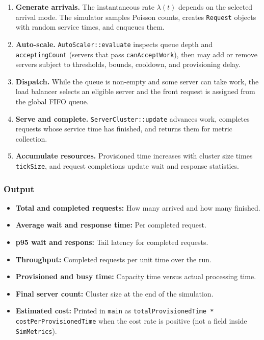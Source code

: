 \documentclass[12pt, a4paper]{article}
\newcommand{\code}[1]{\texttt{\textcolor{NUNavyL}{#1}}}
\begin{document}
\begin{enumerate}[label=\textcolor{NURed}{\textbf{Step \arabic*.}},
                  leftmargin=2.2em]
  \item \textbf{Generate arrivals.} The instantaneous rate $\lambda(t)$ depends
    on the selected arrival mode. The simulator samples Poisson counts, creates
    \code{Request} objects with random service times, and enqueues them.
  \item \textbf{Auto-scale.} \code{AutoScaler::evaluate} inspects queue depth and
    \code{acceptingCount} (servers that pass \code{canAcceptWork}), then may add
    or remove servers subject to thresholds, bounds, cooldown, and provisioning
    delay.
  \item \textbf{Dispatch.} While the queue is non-empty and some server can take
    work, the load balancer selects an eligible server and the front request is
    assigned from the global FIFO queue.
  \item \textbf{Serve and complete.} \code{ServerCluster::update} advances work,
    completes requests whose service time has finished, and returns them for
    metric collection.
  \item \textbf{Accumulate resources.} Provisioned time increases with cluster
    size times \code{tickSize}, and request completions update wait and response
    statistics.
\end{enumerate}

\subsubsection{Output}
\begin{itemize}[label=\textcolor{IPOGreen}{$\rightarrow$}]
  \item \textbf{Total and completed requests:} How many arrived and how many finished.
  \item \textbf{Average wait and response time:} Per completed request.
  \item \textbf{p95 wait and respons:} Tail latency for completed requests.
  \item \textbf{Throughput:} Completed requests per unit time over the run.
  \item \textbf{Provisioned and busy time:} Capacity time versus actual processing time.
  \item \textbf{Final server count:} Cluster size at the end of the simulation.
  \item \textbf{Estimated cost:} Printed in \texttt{main} as
    \code{totalProvisionedTime * costPerProvisionedTime} when the cost rate is
    positive (not a field inside \code{SimMetrics}).
\end{itemize}
\end{document}
